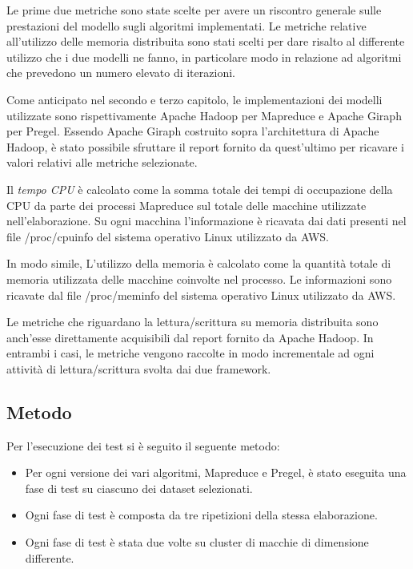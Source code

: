 \documentclass[LaM,binding=0.6cm]{sapthesis}
\begin{document}
Le prime due metriche sono state scelte per avere un riscontro generale sulle prestazioni del modello sugli algoritmi implementati.
Le metriche relative all'utilizzo delle memoria distribuita sono stati scelti per dare risalto al differente utilizzo che i due modelli ne fanno, in particolare modo in relazione ad algoritmi che prevedono un numero elevato di iterazioni.

Come anticipato nel secondo e terzo capitolo, le implementazioni dei modelli utilizzate sono rispettivamente Apache Hadoop \cite{1_hadoop.apache.org_2015} per Mapreduce e Apache Giraph \cite{4_giraph.apache.org_2015} per Pregel. Essendo Apache Giraph costruito sopra l'architettura di Apache Hadoop, è stato possibile sfruttare il report fornito da quest'ultimo per ricavare i valori relativi alle metriche selezionate.

Il \textit{tempo CPU} è calcolato come la somma totale dei tempi di occupazione della CPU da parte dei processi Mapreduce sul totale delle macchine utilizzate nell'elaborazione. Su ogni macchina l'informazione è ricavata dai dati presenti nel file /proc/cpuinfo del sistema operativo Linux utilizzato da AWS.

In modo simile, L'utilizzo della memoria è calcolato come la quantità totale di memoria utilizzata delle macchine coinvolte nel processo. Le informazioni sono ricavate dal file /proc/meminfo  del sistema operativo Linux utilizzato da AWS.

Le metriche che riguardano la lettura/scrittura su memoria distribuita sono anch'esse direttamente acquisibili dal report fornito da Apache Hadoop.  In entrambi i casi, le metriche vengono raccolte in modo incrementale ad ogni attività di lettura/scrittura svolta dai due framework.

\subsection{Metodo}

Per l'esecuzione dei test  si è seguito il seguente metodo:

\begin{itemize}
	\item Per ogni versione dei vari algoritmi, Mapreduce e Pregel, è stato eseguita una fase di test su ciascuno dei dataset selezionati.
	\item Ogni fase di test è composta da tre ripetizioni della stessa elaborazione.
	\item Ogni fase di test è stata due volte su cluster di macchie di dimensione differente.
\end{itemize}
\end{document}
